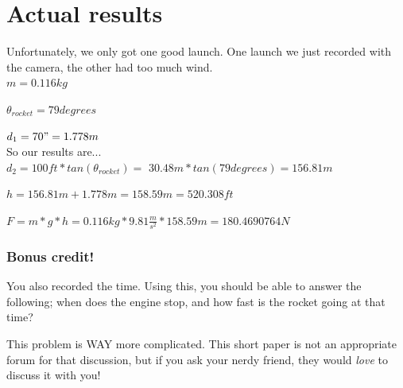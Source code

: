 \documentclass{article}
\begin{document}
\section{Actual results}

Unfortunately, we only got one good launch.
One launch we just recorded with the camera, the other had too much wind. \\

$m=0.116kg$

$\theta_{rocket}=79 degrees$

$d_1=70"=1.778m$ \\

So our results are... \\

$d_2=100ft*tan(\theta_{rocket})=$
$30.48m*tan(79 degrees)=156.81m$

$h=156.81m+1.778m=158.59m=520.308ft$

$F=m*g*h=0.116kg*9.81\frac{m}{s^2}*158.59m=180.4690764N$
\textsc{\textsc{}}

\subsubsection{Bonus credit!}

You also recorded the time.
Using this, you should be able to answer the following; when does the engine stop, and how fast is the rocket going at that time?

This problem is WAY more complicated.
This short paper is not an appropriate forum for that discussion, but if you ask your nerdy friend, they would \textit{love} to discuss it with you!

\end{document}
